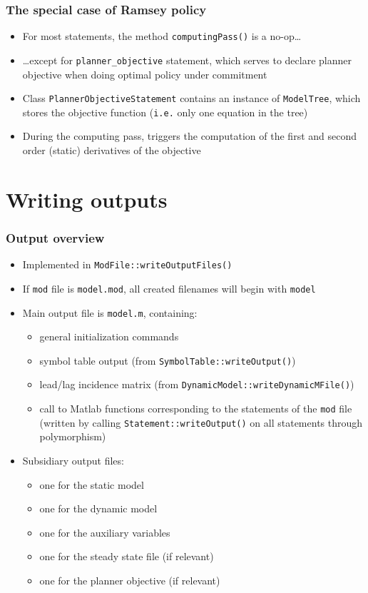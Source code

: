 \documentclass{beamer}
\begin{document}
\begin{frame}
  \frametitle{The special case of Ramsey policy}
  \begin{itemize}
  \item For most statements, the method \texttt{computingPass()} is a no-op\ldots
  \item \ldots except for \texttt{planner\_objective} statement, which serves to declare planner objective when doing optimal policy under commitment
  \item Class \texttt{PlannerObjectiveStatement} contains an instance of \texttt{ModelTree}, which stores the objective function (\texttt{i.e.} only one equation in the tree)
  \item During the computing pass, triggers the computation of the first and second order (static) derivatives of the objective
  \end{itemize}
\end{frame}

\section{Writing outputs}

\begin{frame}
  \frametitle{Output overview}
  \begin{itemize}
  \item Implemented in \texttt{ModFile::writeOutputFiles()}
  \item If \texttt{mod} file is \texttt{model.mod}, all created filenames will begin with \texttt{model}
  \item Main output file is \texttt{model.m}, containing:
    \begin{itemize}
    \item general initialization commands
    \item symbol table output (from \texttt{SymbolTable::writeOutput()})
    \item lead/lag incidence matrix (from \texttt{DynamicModel::writeDynamicMFile()})
    \item call to Matlab functions corresponding to the statements of the \texttt{mod} file (written by calling \texttt{Statement::writeOutput()} on all statements through polymorphism)
    \end{itemize}
  \item Subsidiary output files:
    \begin{itemize}
    \item one for the static model
    \item one for the dynamic model
    \item one for the auxiliary variables
    \item one for the steady state file (if relevant)
    \item one for the planner objective (if relevant)
    \end{itemize}
  \end{itemize}
\end{frame}
\end{document}
